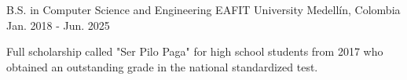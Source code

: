 

\begin{cventries}

  \cventry
    {B.S. in Computer Science and Engineering} %
    {EAFIT University} %
    {Medellín, Colombia} %
    {Jan. 2018 - Jun. 2025} %
    {
      \begin{cvitems} %
        \item {Full scholarship called "Ser Pilo Paga" for high school students from 2017 who
        obtained an outstanding grade in the national standardized test.}
      \end{cvitems}
    }

\end{cventries}
